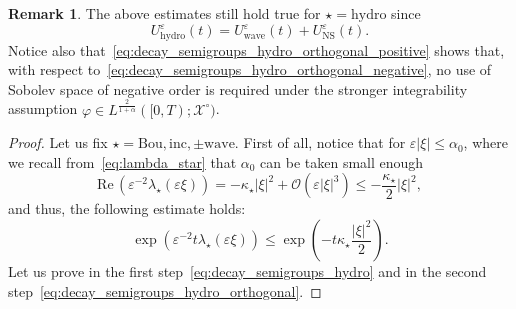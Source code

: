 \documentclass[10pt]{amsart}
\theoremstyle{definition}\newtheorem{defi}[theo]{Definition}\newtheorem{rema}[theo]{Remark}\newtheorem{exam}[theo]{Example}\newtheorem{exem}[theo]{Example}\newtheorem{nota}[theo]{Notation}
\newcommand{\ns}{\mathrm{NS}}
\newcommand{\hyd}{\mathrm{hydro}}
\newcommand{\Wave}{\mathrm{wave}}
\newcommand{\Inc}{\mathrm{inc}}
\newcommand{\Bou}{\mathrm{Bou}}
\newcommand{\re}{\mathrm{Re}\,}
\newcommand{\OO}{\mathcal{O}}
\newcommand{\XX}{\mathcal{X}}
\newcommand{\SSlm}{\XX^{\circ}}
\renewcommand*\le{\leqslant}
\newcommand*\eps{{\varepsilon}}
\begin{document}
\begin{rema}
The above estimates still hold true for $\star=\hyd$ since
\[
U^\eps_\hyd(t)=U^\eps_\Wave(t)+U^\eps_\ns(t).
\]
Notice also that~\eqref{eq:decay_semigroups_hydro_orthogonal_positive} shows that, with respect to~\eqref{eq:decay_semigroups_hydro_orthogonal_negative}, no use of Sobolev space of negative order is required under the stronger integrability assumption $\varphi \in L^{\frac{2}{1+\alpha}}([0, T) ; \SSlm)$.
\end{rema}

\begin{proof}
Let us fix $\star=\Bou,\Inc,\pm\Wave$. First of all, notice that for $\eps | \xi | \le \alpha_{0}$, where we recall from~\eqref{eq:lambda_star} that $\alpha_{0}$ can be taken small enough
\[
\re \left(\eps^{-2} \lambda_\star(\eps \xi) \right) = - \kappa_\star | \xi |^2 + \OO\left(\eps | \xi |^3 \right) \le - \frac{\kappa_\star}{2} | \xi |^2,
\]
and thus, the following estimate holds:
\[
\exp\left(\eps^{-2} t \lambda_\star(\eps \xi) \right) \le \exp\left(- t \kappa_\star \frac{|\xi|^2}{2}\right).
\]
Let us prove in the first step~\eqref{eq:decay_semigroups_hydro} and in the second step~\eqref{eq:decay_semigroups_hydro_orthogonal}.


\end{proof}
\end{document}
